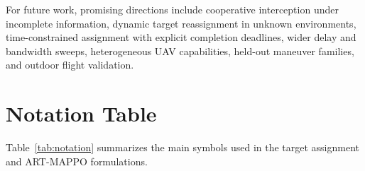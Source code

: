 \documentclass[lettersize,journal]{IEEEtran}
\begin{document}
For future work, promising directions include cooperative interception under incomplete
information, dynamic target reassignment in unknown environments, time-constrained assignment
with explicit completion deadlines, wider delay and bandwidth sweeps,
heterogeneous UAV capabilities, held-out maneuver families, and outdoor flight
validation.




\appendices
\section{Notation Table}
\label{app:notation}

Table~\ref{tab:notation} summarizes the main symbols used in the target assignment and
ART-MAPPO formulations.
\end{document}
